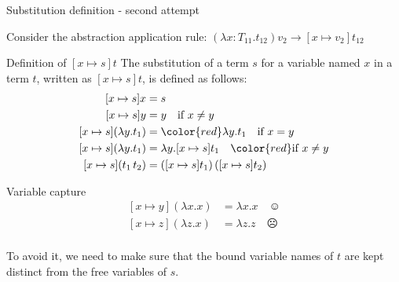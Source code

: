 \documentclass[8pt]{beamer}
\begin{document}
\begin{frame}{Substitution definition - second attempt}

    Consider the abstraction application rule:
        $(\lambda x:T_{11}.t_{12})v_{2} \rightarrow [x \mapsto v_{2}]t_{12}$

    \pause

    \begin{block}{Definition of $[x \mapsto s]t$}
        The substitution of a term $s$ for a variable named $x$ in a term $t$,
        written as $[x \mapsto s]t$, is defined as follows:
        \begin{displaymath}
            \begin{split}
                [x \mapsto s]x &= s \\
                [x \mapsto s]y &= y \quad \text{if } x \not = y\\
                [x \mapsto s](\lambda y.t_{1}) &= {\color{red} \lambda y. t_{1} 
                    \quad \text{if } x = y}\\
                [x \mapsto s](\lambda y.t_{1}) &= \lambda y. [x \mapsto s]t_{1} 
                    \quad {\color{red} \text{if } x \not = y}\\
                [x \mapsto s](t_{1} \, t_{2}) &= 
                    ([x \mapsto s]t_{1})\, ([x \mapsto s]t_{2})\\
            \end{split}
        \end{displaymath}        
    \end{block}

    \pause

    \begin{alertblock}{Variable capture}
        \begin{displaymath}
            \begin{split}
                [x \mapsto y](\lambda x.x) &= \lambda x.x \quad \smiley \\
                [x \mapsto z](\lambda z.x) &= \lambda z.z \quad \frownie\\ 
            \end{split}
        \end{displaymath}
    \end{alertblock}
    \pause
    To avoid it, we need to make sure that the bound variable names of $t$
    are kept distinct from the free variables of $s$.
\end{frame}
\end{document}
